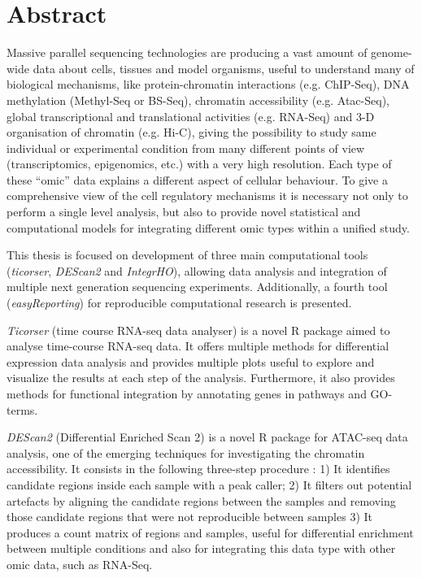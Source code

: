 \section*{Abstract}
{\setlength{\parindent}{0cm}
Massive parallel sequencing technologies are producing a vast amount of genome-wide data about cells, tissues and model organisms, useful to understand many of biological mechanisms, like protein-chromatin interactions (e.g. ChIP-Seq), DNA methylation (Methyl-Seq or BS-Seq), chromatin accessibility (e.g. Atac-Seq), global transcriptional and translational activities (e.g. RNA-Seq) and 3-D organisation of chromatin (e.g. Hi-C), giving the possibility to study same individual or experimental condition from many different points of view (transcriptomics, epigenomics, etc.) with a very high resolution. Each type of these “omic” data explains a different aspect of cellular behaviour. To give a comprehensive view of the cell regulatory mechanisms it is necessary not only to perform a single level analysis, but also to provide novel statistical and computational models for integrating different omic types within a unified study.

This thesis is focused on development of three main computational tools (\textit{ticorser}, \textit{DEScan2} and \textit{IntegrHO}), allowing data analysis and integration of multiple next generation sequencing experiments.
Additionally, a fourth tool (\textit{easyReporting}) for reproducible computational research is presented.

\textit{Ticorser} (time course RNA-seq data analyser) is a novel R package aimed to analyse time-course RNA-seq data. It offers multiple methods for differential expression data analysis and provides multiple plots useful to explore and visualize the results at each step of the analysis. Furthermore, it also provides methods for functional integration by annotating genes in pathways and GO-terms.

\textit{DEScan2} (Differential Enriched Scan 2) is a novel R package for ATAC-seq data analysis, one of the emerging techniques for investigating the chromatin accessibility. It consists in the following three-step procedure : 1) It identifies candidate regions inside each sample with a peak caller; 2) It filters out potential artefacts by aligning the candidate regions between the samples and removing those candidate regions that were not reproducible between samples 3) It produces a count matrix of regions and samples, useful for differential enrichment between multiple conditions and also for integrating this data type with other omic data, such as RNA-Seq.

}
